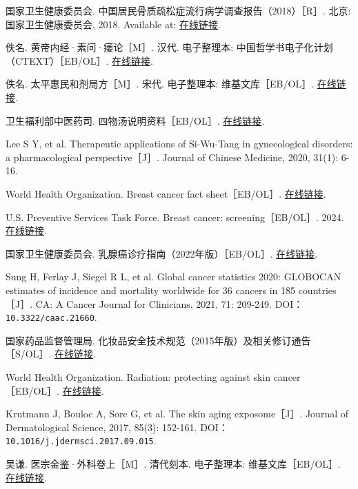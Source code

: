 \begin{enumerate}[label={[Q\arabic*]},leftmargin=*]
  \item 国家卫生健康委员会. 中国居民骨质疏松症流行病学调查报告（2018）［R］. 北京: 国家卫生健康委员会, 2018. Available at: \href{https://www.nhc.gov.cn/ewebeditor/uploadfile/2018/10/20181020192813503.pdf}{在线链接}.
  \item 佚名. 黄帝内经·素问·痿论［M］. 汉代. 电子整理本: 中国哲学书电子化计划（CTEXT）［EB/OL］. \href{https://ctext.org/huangdi-neijing/wei-lun/zh}{在线链接}.
  \item 佚名. 太平惠民和剂局方［M］. 宋代. 电子整理本: 维基文库［EB/OL］. \href{https://zh.wikisource.org/zh-hans/太平惠民和劑局方}{在线链接}.
  \item 卫生福利部中医药司. 四物汤说明资料［EB/OL］. \href{https://dep.mohw.gov.tw/DOCMAP/fp-866-5530-108.html}{在线链接}.
  \item Lee S Y, et al. Therapeutic applications of Si-Wu-Tang in gynecological disorders: a pharmacological perspective［J］. Journal of Chinese Medicine, 2020, 31(1): 6-16.
  \item World Health Organization. Breast cancer fact sheet［EB/OL］. \href{https://www.who.int/news-room/fact-sheets/detail/breast-cancer}{在线链接}.
  \item U.S. Preventive Services Task Force. Breast cancer: screening［EB/OL］. 2024. \href{https://www.uspreventiveservicestaskforce.org/uspstf/recommendation/breast-cancer-screening1}{在线链接}.
  \item 国家卫生健康委员会. 乳腺癌诊疗指南（2022年版）［EB/OL］. \href{https://www.nhc.gov.cn/cms-search/downFiles/c001a73dfefc4ace889a1ea6e0230865.pdf}{在线链接}.
  \item Sung H, Ferlay J, Siegel R L, et al. Global cancer statistics 2020: GLOBOCAN estimates of incidence and mortality worldwide for 36 cancers in 185 countries［J］. CA: A Cancer Journal for Clinicians, 2021, 71: 209-249. DOI：\nolinkurl{10.3322/caac.21660}.
  \item 国家药品监督管理局. 化妆品安全技术规范（2015年版）及相关修订通告［S/OL］. \href{https://www.nmpa.gov.cn/}{在线链接}.
  \item World Health Organization. Radiation: protecting against skin cancer［EB/OL］. \href{https://www.who.int/news-room/questions-and-answers/item/radiation-protecting-against-skin-cancer}{在线链接}.
  \item Krutmann J, Bouloc A, Sore G, et al. The skin aging exposome［J］. Journal of Dermatological Science, 2017, 85(3): 152-161. DOI：\nolinkurl{10.1016/j.jdermsci.2017.09.015}.
  \item 吴谦. 医宗金鉴·外科卷上［M］. 清代刻本. 电子整理本: 维基文库［EB/OL］. \href{https://zh.wikisource.org/zh-hans/醫宗金鑑/外科卷上}{在线链接}.

\end{enumerate}
